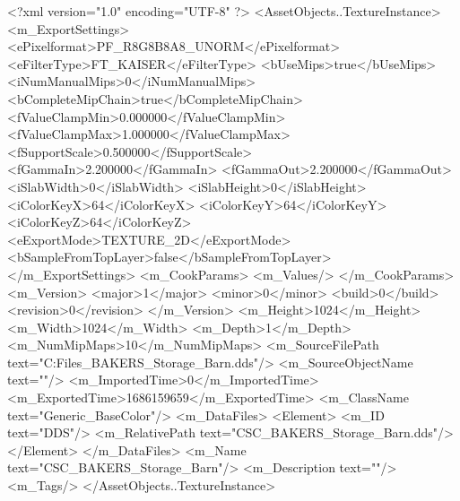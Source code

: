 <?xml version="1.0" encoding="UTF-8" ?>
<AssetObjects..TextureInstance>
	<m_ExportSettings>
		<ePixelformat>PF_R8G8B8A8_UNORM</ePixelformat>
		<eFilterType>FT_KAISER</eFilterType>
		<bUseMips>true</bUseMips>
		<iNumManualMips>0</iNumManualMips>
		<bCompleteMipChain>true</bCompleteMipChain>
		<fValueClampMin>0.000000</fValueClampMin>
		<fValueClampMax>1.000000</fValueClampMax>
		<fSupportScale>0.500000</fSupportScale>
		<fGammaIn>2.200000</fGammaIn>
		<fGammaOut>2.200000</fGammaOut>
		<iSlabWidth>0</iSlabWidth>
		<iSlabHeight>0</iSlabHeight>
		<iColorKeyX>64</iColorKeyX>
		<iColorKeyY>64</iColorKeyY>
		<iColorKeyZ>64</iColorKeyZ>
		<eExportMode>TEXTURE_2D</eExportMode>
		<bSampleFromTopLayer>false</bSampleFromTopLayer>
	</m_ExportSettings>
	<m_CookParams>
		<m_Values/>
	</m_CookParams>
	<m_Version>
		<major>1</major>
		<minor>0</minor>
		<build>0</build>
		<revision>0</revision>
	</m_Version>
	<m_Height>1024</m_Height>
	<m_Width>1024</m_Width>
	<m_Depth>1</m_Depth>
	<m_NumMipMaps>10</m_NumMipMaps>
	<m_SourceFilePath text="C:\Users\Shadow\Desktop\Working Files\Textures\CSC_BAKERS_Storage_Barn.dds"/>
	<m_SourceObjectName text=""/>
	<m_ImportedTime>0</m_ImportedTime>
	<m_ExportedTime>1686159659</m_ExportedTime>
	<m_ClassName text="Generic_BaseColor"/>
	<m_DataFiles>
		<Element>
			<m_ID text="DDS"/>
			<m_RelativePath text="CSC_BAKERS_Storage_Barn.dds"/>
		</Element>
	</m_DataFiles>
	<m_Name text="CSC_BAKERS_Storage_Barn"/>
	<m_Description text=""/>
	<m_Tags/>
</AssetObjects..TextureInstance>

